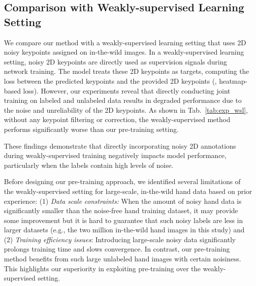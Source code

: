 \subsection{Comparison with Weakly-supervised Learning Setting}

We compare our method with a weakly-supervised learning setting that uses 2D noisy keypoints assigned on in-the-wild images.
In a weakly-supervised learning setting, noisy 2D keypoints are directly used as supervision signals during network training. The model treats these 2D keypoints as targets, computing the loss between the predicted keypoints and the provided 2D keypoints (\eg, heatmap-based loss).
However, our experiments reveal that directly conducting joint training on labeled and unlabeled data results in degraded performance due to the noise and unreliability of the 2D keypoints. As shown in Tab.~\ref{tab:exp_wsl}, without any keypoint filtering or correction, the weakly-supervised method performs significantly worse than our pre-training setting.



These findings demonstrate that directly incorporating noisy 2D annotations during weakly-supervised training negatively impacts model performance, particularly when the labels contain high levels of noise.

Before designing our pre-training approach, we identified several limitations of the weakly-supervised setting for large-scale, in-the-wild hand data based on prior experience: (1) \textit{Data scale constraints:} When the amount of noisy hand data is significantly smaller than the noise-free hand training dataset, it may provide some improvement but it is hard to guarantee that such noisy labels are less in larger datasets (e.g., the two million in-the-wild hand images in this study) and (2) \textit{Training efficiency issues}: Introducing large-scale noisy data significantly prolongs training time and slows convergence. In contrast, our pre-training method benefits from such large unlabeled hand images with certain noisiness. This highlights our superiority in exploiting pre-training over the weakly-supervised setting.